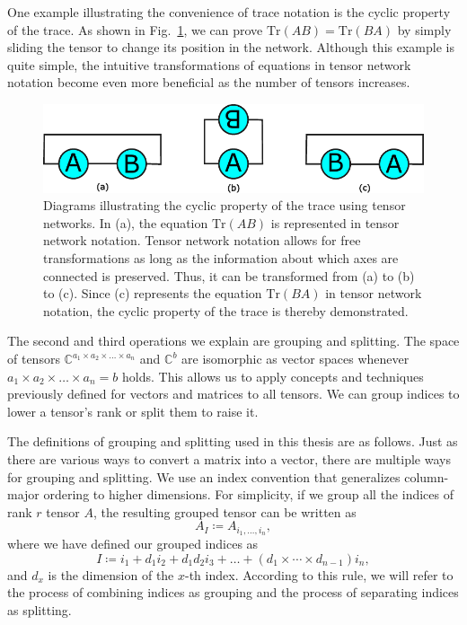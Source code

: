 \documentclass[12pt,dvipdfmx,twoside,openright]{report}
\begin{document}
One example illustrating the convenience of trace notation is the cyclic property of the trace.
As shown in Fig.~\ref{fig:trace-cyclic}, we can prove $\mathrm{Tr}(AB)=\mathrm{Tr}(BA)$ by simply sliding the tensor to change its position in the network.
Although this example is quite simple, the intuitive transformations of equations in tensor network notation become even more beneficial as the number of tensors increases.

\begin{figure}
    \centering
    \includegraphics[width=\linewidth]{trace-cyclic.pdf}
    \caption{Diagrams illustrating the cyclic property of the trace using tensor networks. In (a), the equation $\mathrm{Tr}(AB)$ is represented in tensor network notation. Tensor network notation allows for free transformations as long as the information about which axes are connected is preserved. Thus, it can be transformed from (a) to (b) to (c). Since (c) represents the equation $\mathrm{Tr}(BA)$ in tensor network notation, the cyclic property of the trace is thereby demonstrated.}
    \label{fig:trace-cyclic}
\end{figure}

The second and third operations we explain are grouping and splitting.
The space of tensors $\mathbb C^{a_1\times a_2\times \dots \times a_n}$ and $\mathbb C^b$ are isomorphic as vector spaces whenever $a_1\times a_2\times \dots \times a_n=b$ holds.
This allows us to apply concepts and techniques previously defined for vectors and matrices to all tensors.
We can group indices to lower a tensor's rank or split them to raise it.

The definitions of grouping and splitting used in this thesis are as follows.
Just as there are various ways to convert a matrix into a vector, there are multiple ways for grouping and splitting.
We use an index convention that generalizes column-major ordering to higher dimensions.
For simplicity, if we group all the indices of rank $r$ tensor $A$, the resulting grouped tensor can be written as
\begin{equation}
    A_I \coloneqq A_{i_1,\dots,i_n},
\end{equation}
where we have defined our grouped indices as
\begin{equation}
    I \coloneqq i_1 + d_1 i_2 + d_1 d_2 i_3 + \dots + (d_1 \times \cdots \times d_{n-1}) i_n ,
\end{equation}
and $d_x$ is the dimension of the $x$-th index.
According to this rule, we will refer to the process of combining indices as grouping and the process of separating indices as splitting.
\end{document}
